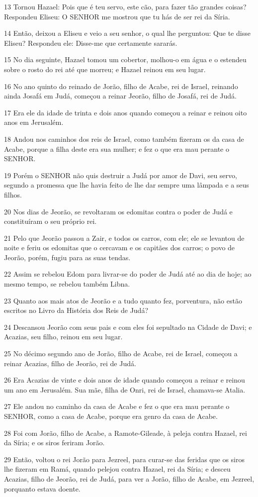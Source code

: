 \par 13 Tornou Hazael: Pois que é teu servo, este cão, para fazer tão grandes coisas? Respondeu Eliseu: O SENHOR me mostrou que tu hás de ser rei da Síria.
\par 14 Então, deixou a Eliseu e veio a seu senhor, o qual lhe perguntou: Que te disse Eliseu? Respondeu ele: Disse-me que certamente sararás.
\par 15 No dia seguinte, Hazael tomou um cobertor, molhou-o em água e o estendeu sobre o rosto do rei até que morreu; e Hazael reinou em seu lugar.
\par 16 No ano quinto do reinado de Jorão, filho de Acabe, rei de Israel, reinando ainda Josafá em Judá, começou a reinar Jeorão, filho de Josafá, rei de Judá.
\par 17 Era ele da idade de trinta e dois anos quando começou a reinar e reinou oito anos em Jerusalém.
\par 18 Andou nos caminhos dos reis de Israel, como também fizeram os da casa de Acabe, porque a filha deste era sua mulher; e fez o que era mau perante o SENHOR.
\par 19 Porém o SENHOR não quis destruir a Judá por amor de Davi, seu servo, segundo a promessa que lhe havia feito de lhe dar sempre uma lâmpada e a seus filhos.
\par 20 Nos dias de Jeorão, se revoltaram os edomitas contra o poder de Judá e constituíram o seu próprio rei.
\par 21 Pelo que Jeorão passou a Zair, e todos os carros, com ele; ele se levantou de noite e feriu os edomitas que o cercavam e os capitães dos carros; o povo de Jeorão, porém, fugiu para as suas tendas.
\par 22 Assim se rebelou Edom para livrar-se do poder de Judá até ao dia de hoje; ao mesmo tempo, se rebelou também Libna.
\par 23 Quanto aos mais atos de Jeorão e a tudo quanto fez, porventura, não estão escritos no Livro da História dos Reis de Judá?
\par 24 Descansou Jeorão com seus pais e com eles foi sepultado na Cidade de Davi; e Acazias, seu filho, reinou em seu lugar.
\par 25 No décimo segundo ano de Jorão, filho de Acabe, rei de Israel, começou a reinar Acazias, filho de Jeorão, rei de Judá.
\par 26 Era Acazias de vinte e dois anos de idade quando começou a reinar e reinou um ano em Jerusalém. Sua mãe, filha de Onri, rei de Israel, chamava-se Atalia.
\par 27 Ele andou no caminho da casa de Acabe e fez o que era mau perante o SENHOR, como a casa de Acabe, porque era genro da casa de Acabe.
\par 28 Foi com Jorão, filho de Acabe, a Ramote-Gileade, à peleja contra Hazael, rei da Síria; e os siros feriram Jorão.
\par 29 Então, voltou o rei Jorão para Jezreel, para curar-se das feridas que os siros lhe fizeram em Ramá, quando pelejou contra Hazael, rei da Síria; e desceu Acazias, filho de Jeorão, rei de Judá, para ver a Jorão, filho de Acabe, em Jezreel, porquanto estava doente.

